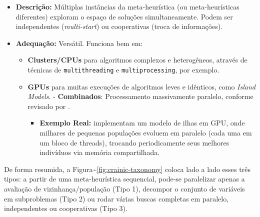\begin{enumerate}
        \begin{itemize}
          \tightlist
          \item
                \textbf{Descrição:} Múltiplas instâncias da meta-heurística (ou
                meta-heurísticas diferentes) exploram o espaço de soluções
                simultaneamente. Podem ser independentes (\emph{multi-start}) ou
                cooperativas (troca de informações).
          \item
                \textbf{Adequação:} Versátil. Funciona bem em:

                \begin{itemize}
                  \tightlist
                  \item
                        \textbf{Clusters/CPUs} para algoritmos complexos e heterogêneos,
                        através de técnicas de \texttt{multithreading} e
                        \texttt{multiprocessing}, por exemplo.
                  \item
                        \textbf{GPUs} para muitas execuções de algoritmos leves e
                        idênticos, como \emph{Island Models}. - \textbf{Combinados}:
                        Processamento massivamente paralelo, conforme revisado por
                        \textcite{schulz2013gpu}.

                        \begin{itemize}
                          \tightlist
                          \item
                                \textbf{Exemplo Real:} \textcite{luong2013gpu} implementam um
                                modelo de ilhas em GPU, onde milhares de pequenas populações
                                evoluem em paralelo (cada uma em um bloco de threads), trocando
                                periodicamente seus melhores indivíduos via memória
                                compartilhada.
                        \end{itemize}
                \end{itemize}
        \end{itemize}
\end{enumerate}

De forma resumida, a Figura\textasciitilde{}\ref{fig:crainic-taxonomy}
coloca lado a lado esses três tipos: a partir de uma meta-heurística
sequencial, pode-se paralelizar apenas a avaliação de
vizinhança/população (Tipo 1), decompor o conjunto de variáveis em
subproblemas (Tipo 2) ou rodar várias buscas completas em paralelo,
independentes ou cooperativas (Tipo 3).

